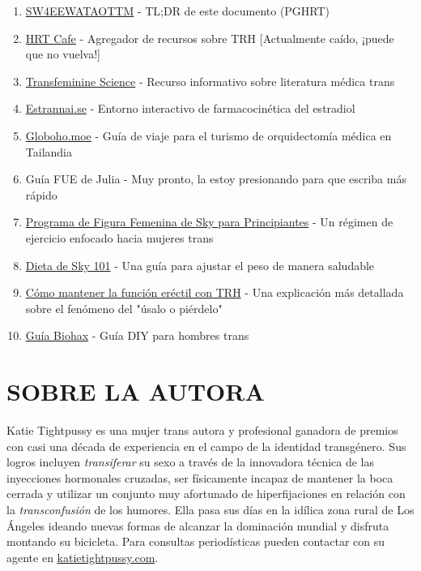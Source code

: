 \documentclass{article}
\begin{document}
\begin{enumerate}
  \item \href{https://startwith4mgestradiolenanthateweeklyandtestatonetothreemonths.com/}{SW4EEWATAOTTM} - TL;DR de este documento (PGHRT)
  \item \href{https://web.archive.org/web/20260310142419/https://hrtcafe.net/}{HRT Cafe} - Agregador de recursos sobre TRH [Actualmente caído, ¡puede que no vuelva!]
  \item \href{https://transfemscience.org/}{Transfeminine Science} - Recurso informativo sobre literatura médica trans
  \item \href{https://estrannai.se}{Estrannai.se} - Entorno interactivo de farmacocinética del estradiol
  \item \href{https://globoho.moe/}{Globoho.moe} - Guía de viaje para el turismo de orquidectomía médica en Tailandia
  \item Guía FUE de Julia - Muy pronto, la estoy presionando para que escriba más rápido
  \item \href{https://docs.google.com/document/d/1-NyE5EY5TTaRRMhk7HlTbKJ7HifjEsA4jlDO1qKQVl0/edit?tab=t.0}{Programa de Figura Femenina de Sky para Principiantes} - Un régimen de ejercicio enfocado hacia mujeres trans
  \item \href{https://docs.google.com/document/d/114sztSw1aVWM2pXLDl9NrHklyvewz3EmFiHiisjM71k/edit?tab=t.0}{Dieta de Sky 101} - Una guía para ajustar el peso de manera saludable
  \item \href{https://stainedglasswoman.substack.com/p/how-to-maintain-your-penis-function}{Cómo mantener la función eréctil con TRH} - Una explicación más detallada sobre el fenómeno del "úsalo o piérdelo"
  \item \href{https://mega.nz/folder/cfwSmBbY#ify6kaueB8SdDD1v12t2Dw}{Guía Biohax} - Guía DIY para hombres trans
\end{enumerate}

\section*{SOBRE LA AUTORA}

Katie Tightpussy es una mujer trans autora y profesional ganadora de premios con casi una década de experiencia en el campo de la identidad transgénero. Sus logros incluyen \textit{transiferar} su sexo a través de la innovadora técnica de las inyecciones hormonales cruzadas, ser físicamente incapaz de mantener la boca cerrada y utilizar un conjunto muy afortunado de hiperfijaciones en relación con la \textit{transconfusión} de los humores. Ella pasa sus días en la idílica zona rural de Los Ángeles ideando nuevas formas de alcanzar la dominación mundial y disfruta montando su bicicleta. Para consultas periodísticas pueden contactar con su agente en \href{http://katietightpussy.com}{katietightpussy.com}.
\end{document}
